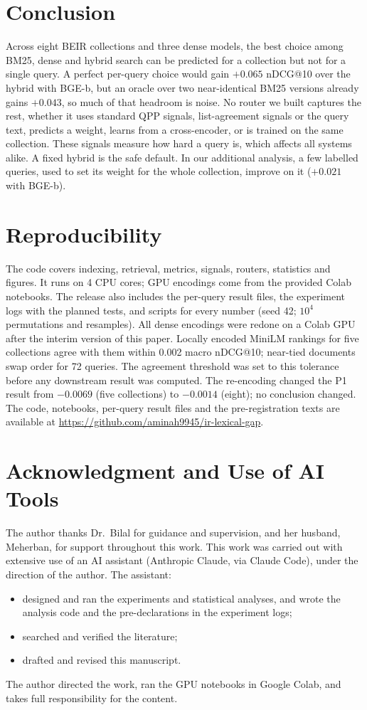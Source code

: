 \documentclass[conference]{IEEEtran}
\makeatletter
\newcommand{\ndcg}{nDCG@10}
\makeatother
\begin{document}
\section{Conclusion}
Across eight BEIR collections and three dense models, the best choice among BM25, dense and hybrid search can be predicted for a collection but not for a single query. A perfect per-query choice would gain $+0.065$ \ndcg{} over the hybrid with BGE-b, but an oracle over two near-identical BM25 versions already gains $+0.043$, so much of that headroom is noise. No router we built captures the rest, whether it uses standard QPP signals, list-agreement signals or the query text, predicts a weight, learns from a cross-encoder, or is trained on the same collection. These signals measure how hard a query is, which affects all systems alike. A fixed hybrid is the safe default. In our additional analysis, a few labelled queries, used to set its weight for the whole collection, improve on it ($+0.021$ with BGE-b).

\section*{Reproducibility}
The code covers indexing, retrieval, metrics, signals, routers, statistics and figures. It runs on 4 CPU cores; GPU encodings come from the provided Colab notebooks. The release also includes the per-query result files, the experiment logs with the planned tests, and scripts for every number (seed 42; $10^4$ permutations and resamples). All dense encodings were redone on a Colab GPU after the interim version of this paper. Locally encoded MiniLM rankings for five collections agree with them within 0.002 macro \ndcg{}; near-tied documents swap order for 72 queries. The agreement threshold was set to this tolerance before any downstream result was computed. The re-encoding changed the P1 result from $-0.0069$ (five collections) to $-0.0014$ (eight); no conclusion changed. The code, notebooks, per-query result files and the pre-registration texts are available at \url{https://github.com/aminah9945/ir-lexical-gap}.

\section*{Acknowledgment and Use of AI Tools}
The author thanks Dr.~Bilal for guidance and supervision, and her husband, Meherban, for support throughout this work. This work was carried out with extensive use of an AI assistant (Anthropic Claude, via Claude Code), under the direction of the author. The assistant:
\begin{itemize}
\item designed and ran the experiments and statistical analyses, and wrote the analysis code and the pre-declarations in the experiment logs;
\item searched and verified the literature;
\item drafted and revised this manuscript.
\end{itemize}
The author directed the work, ran the GPU notebooks in Google Colab, and takes full responsibility for the content.



\end{document}
